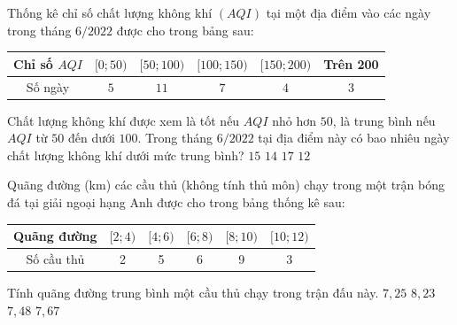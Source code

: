 \begin{ex}%
	Thống kê chỉ số chất lượng không khí $(AQI)$ tại một địa điểm vào các ngày trong tháng $6 / 2022$ được cho trong bảng sau:
	\begin{center}
	\begin{tabular}{|c|c|c|c|c|c|}
	\hline Chỉ số $AQI$ & {$[0; 50)$} & {$[50; 100)$} & {$[100; 150)$} & {$[150; 200)$} & Trên 200 \\
	\hline Số ngày & $5$ & $11$ & $7$ & $4$ & $3$ \\
	\hline
	\end{tabular}
	\end{center}
	Chất lượng không khí được xem là tốt nếu $AQI$ nhỏ hơn $50$, là trung bình nếu $AQI$ từ $50$ đến dưới $100$. Trong tháng $6/2022$ tại địa điểm này có bao nhiêu ngày chất lượng không khí dưới mức trung bình?
	\choice 
	{$15$}
	{\True $14$}
	{$17$}
	{$12$}
\end{ex}

\begin{ex}%
	Quãng đường (km) các cầu thủ (không tính thủ môn) chạy trong một trận bóng đá tại giải ngoại hạng Anh được cho trong bảng thống kê sau:
	\begin{center}
		\begin{tabular}{|c|c|c|c|c|c|}
			\hline Quãng đường & {$[2 ; 4)$} & {$[4 ; 6)$} & {$[6 ; 8)$} & {$[8 ; 10)$} & {$[10 ; 12)$} \\
			\hline Số cầu thủ & 2 & 5 & 6 & 9 & 3 \\
			\hline
		\end{tabular}
	\end{center}
		Tính quãng đường trung bình một cầu thủ chạy trong trận đấu này.
		\choice 
		{$7{,}25$}
		{$8{,}23$}
		{\True $7{,}48$}
		{$7{,}67$}
\end{ex}
	
